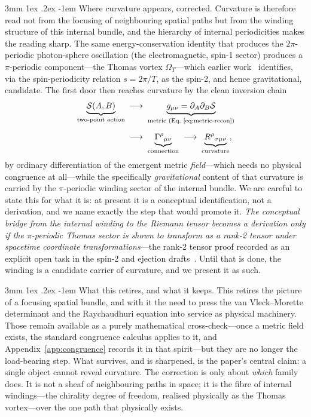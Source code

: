 \documentclass[%
 reprint, amsmath,amssymb, aps, prb, ]{revtex4-2}
\makeatletter
\numberwithin{equation}{section}
\renewcommand\paragraph{%
  \@startsection{paragraph}{4}{\z@}%
    {3mm \@plus 1ex \@minus .2ex}%
    {-1em}%
    {\normalfont\normalsize\itshape}}
\makeatother
\begin{document}
\paragraph{Where curvature appears, corrected.}
Curvature is therefore read not from the focusing of neighbouring spatial paths but from the winding structure of this internal bundle, and the hierarchy of internal periodicities makes the reading sharp. The same energy-conservation identity that produces the $2\pi$-periodic photon-sphere oscillation (the electromagnetic, spin-1 sector) produces a $\pi$-periodic component---the Thomas vortex $\Omega_T$---which earlier work~\cite{hanamura48} identifies, via the spin-periodicity relation $s=2\pi/T$, as the spin-2, and hence gravitational, candidate. The first door then reaches curvature by the clean inversion chain
\begin{align}
\underbrace{\mathcal{S}(A,B)}_{\text{two-point action}}
\;&\longrightarrow\;
\underbrace{g_{\mu\nu}=\partial_{A}\partial_{B}\mathcal{S}}_{\text{metric (Eq.~\ref{eq:metric-recon})}}
\notag\\[1.2ex]
&\longrightarrow\;
\underbrace{\Gamma^\rho{}_{\mu\nu}}_{\text{connection}}
\;\longrightarrow\;
\underbrace{R^\rho{}_{\sigma\mu\nu}}_{\text{curvature}},
\label{eq:inversion-first-door}
\end{align}
by ordinary differentiation of the emergent metric \emph{field}---which needs no physical congruence at all---while the specifically \emph{gravitational} content of that curvature is carried by the $\pi$-periodic winding sector of the internal bundle. We are careful to state this for what it is: at present it is a conceptual identification, not a derivation, and we name exactly the step that would promote it. \emph{The conceptual bridge from the internal winding to the Riemann tensor becomes a derivation only if the $\pi$-periodic Thomas sector is shown to transform as a rank-2 tensor under spacetime coordinate transformations}---the rank-2 tensor proof recorded as an explicit open task in the spin-2 and ejection drafts~\cite{hanamura48,hanamura49}. Until that is done, the winding is a candidate carrier of curvature, and we present it as such.

\paragraph{What this retires, and what it keeps.}
This retires the picture of a focusing spatial bundle, and with it the need to press the van Vleck--Morette determinant and the Raychaudhuri equation into service as physical machinery. Those remain available as a purely mathematical cross-check---once a metric field exists, the standard congruence calculus applies to it, and Appendix~\ref{app:congruence} records it in that spirit---but they are no longer the load-bearing step. What survives, and is sharpened, is the paper's central claim: a single object cannot reveal curvature. The correction is only about \emph{which} family does. It is not a sheaf of neighbouring paths in space; it is the fibre of internal windings---the chirality degree of freedom, realised physically as the Thomas vortex---over the one path that physically exists.
\end{document}
